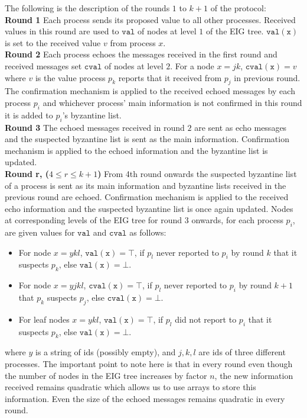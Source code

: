     The following is the description of the rounds $1$ to $k+1$ of the protocol: \\
    \textbf{Round 1} Each process sends its proposed value to all other processes. Received values in this round are used to $\mathtt{val}$ of nodes at level $1$ of the EIG tree. $\mathtt{val(x)}$ is set to the received value $v$ from process $x$. \\
    \textbf{Round 2} Each process echoes the messages received in the first round and received messages set $\mathtt{cval}$ of nodes at level $2$. For a node $x = jk$, $\mathtt{cval(x)} = v$ where $v$ is the value process $p_k$ reports that it received from $p_j$ in previous round. The confirmation mechanism is applied to the received echoed messages by each process $p_i$ and whichever process' main information is not confirmed in this round it is added to $p_i$'s byzantine list. \\
    \textbf{Round 3} The echoed messages received in round $2$ are sent as echo messages and the suspected byzantine list is sent as the main information. Confirmation mechanism is applied to the echoed information and the byzantine list is updated. \\
    \textbf{Round r, ($4 \leq r \leq k+1$)} From 4th round onwards the suspected byzantine list of a process is sent as its main information and byzantine lists received in the previous round are echoed. Confirmation mechanism is applied to the received echo information and the suspected byzantine list is once again updated. Nodes at corresponding levels of the EIG tree for round 3 onwards, for each process $p_i$, are given values for $\mathtt{val}$ and $\mathtt{cval}$ as follows:
    \begin{itemize}
        \item For node $x=ykl$, $\mathtt{val(x)} = \top$, if $p_l$ never reported to $p_i$ by round $k$ that it suspects $p_k$, else $\mathtt{val(x)} = \bot$.
        \item For node $x=yjkl$, $\mathtt{cval(x)} = \top$, if $p_l$ never reported to $p_i$ by round $k+1$ that $p_k$ suspects $p_j$, else $\mathtt{cval(x)} = \bot$.
        \item For leaf nodes $x = ykl$, $\mathtt{val(x)} = \top$, if $p_l$ did not report to $p_i$ that it suspects $p_k$, else $\mathtt{val(x)} = \bot$.
    \end{itemize}
where $y$ is a string of ids (possibly empty), and $j, k, l$ are ids of three different processes. The important point to note here is that in every round even though the number of nodes in the EIG tree increases by factor $n$, the new information received remains quadratic which allows us to use arrays to store this information. Even the size of the echoed messages remains quadratic in every round. 


